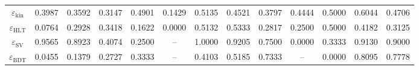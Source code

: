 \documentclass[10pt,a4paper]{article}
\begin{document}
\begin{landscape}
{\begin{tabular}{c|cccc|cccc|cccc}
\midrule
$\varepsilon_{\mathrm{kin}}$ & 0.3987 & 0.3592 & 0.3147 & 0.4901 & 0.1429 & 0.5135 & 0.4521 & 0.3797 & 0.4444 & 0.5000 & 0.6044 & 0.4706\\
$\varepsilon_{\mathrm{HLT}}$ & 0.0764 & 0.2928 & 0.3418 & 0.1622 & 0.0000 & 0.5132 & 0.5333 & 0.2817 & 0.2500 & 0.5000 & 0.4182 & 0.3125\\
$\varepsilon_{\mathrm{SV}}$ & 0.9565 & 0.8923 & 0.4074 & 0.2500 & -- & 1.0000 & 0.9205 & 0.7500 & 0.0000 & 0.3333 & 0.9130 & 0.9000\\
$\varepsilon_{\mathrm{BDT}}$ & 0.0455 & 0.1379 & 0.2727 & 0.3333 & -- & 0.4103 & 0.5185 & 0.7333 & -- & 0.0000 & 0.8095 & 0.7778\\
\bottomrule
\end{tabular}}

\end{landscape}
\clearpage
\end{document}
